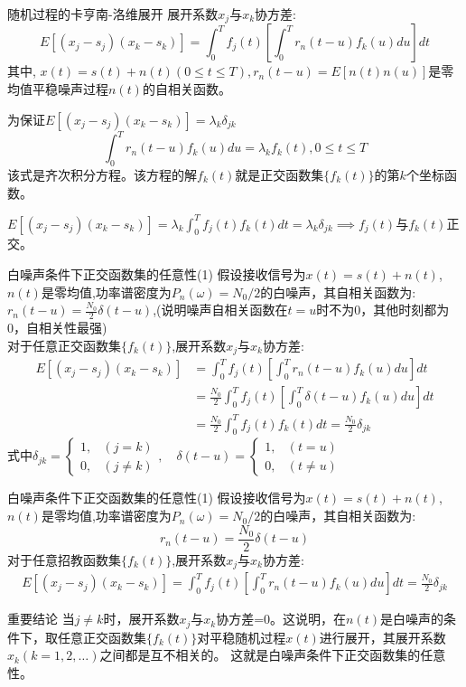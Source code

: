 \begin{frame}{随机过程的卡亨南-洛维展开}
展开系数$x_j$与$x_k$协方差:
\[E[(x_j-s_j)(x_k-s_k)]=\int_{0}^{T}f_j(t)\left[\int_{0}^{T}r_n(t-u)f_k(u)du\right]dt \]
其中, $x(t)=s(t)+n(t)(0\le t\le T),r_n(t-u)=E[n(t)n(u)]$是零均值平稳噪声过程$n(t)$的自相关函数。

为保证$E[(x_j-s_j)(x_k-s_k)]=\lambda_k\delta_{jk}$
\[\int_{0}^{T}r_n(t-u)f_k(u)du=\lambda_kf_k(t), 0\le t\le T \]
该式是齐次积分方程。该方程的解$f_k(t)$就是正交函数集$\{f_k(t) \}$的第$k$个坐标函数。

$E[(x_j-s_j)(x_k-s_k)]=\lambda_k\int_{0}^{T}f_j(t)f_k(t)dt=\lambda_k\delta_{jk}\implies f_j(t)$与$f_k(t)$正交。
\end{frame}

\begin{frame}{白噪声条件下正交函数集的任意性(1)}
假设接收信号为$x(t)=s(t)+n(t)$, $n(t)$是零均值,功率谱密度为$P_n(\omega)=N_0/2$的白噪声，其自相关函数为: $r_n(t-u)=\frac{N_0}{2}\delta(t-u)$,(说明噪声自相关函数在$t=u$时不为0，其他时刻都为0，自相关性最强)\\
对于任意正交函数集$\{f_k(t)\}$,展开系数$x_j$与$x_k$协方差:
\begin{align*}
E[(x_j-s_j)(x_k-s_k)]&=\int_{0}^{T}f_j(t)\left[\int_{0}^{T}r_n(t-u)f_k(u)du\right]dt\\
&=\frac{N_0}{2}\int_{0}^{T}f_j(t)\left[\int_{0}^{T}\delta(t-u)f_k(u)du\right]dt\\
&=\frac{N_0}{2}\int_{0}^{T}f_j(t)f_k(t)dt=\frac{N_0}{2}\delta_{jk}
\end{align*}
式中$\delta_{jk}=
\begin{cases}
1, & (j=k)\\
0, & (j\ne k) 
\end{cases},\quad
\delta(t-u)=
\begin{cases}
	1, & (t=u)\\
	0, & (t\ne u) 
\end{cases}
$
\end{frame}

\begin{frame}{白噪声条件下正交函数集的任意性(1)}
假设接收信号为$x(t)=s(t)+n(t)$, $n(t)$是零均值,功率谱密度为$P_n(\omega)=N_0/2$的白噪声，其自相关函数为: 
\[r_n(t-u)=\frac{N_0}{2}\delta(t-u)\]
对于任意招教函数集$\{f_k(t)\}$,展开系数$x_j$与$x_k$协方差:
\begin{align*}
E[(x_j-s_j)(x_k-s_k)]=\int_{0}^{T}f_j(t)\left[\int_{0}^{T}r_n(t-u)f_k(u)du\right]dt=\frac{N_0}{2}\delta_{jk}
\end{align*}
\begin{block}{重要结论}
	当$j\ne k$时，展开系数$x_j$与$x_k$协方差=0。这说明，在$n(t)$是白噪声的条件下，取任意正交函数集$\{f_k(t)\}$对平稳随机过程$x(t)$进行展开，其展开系数$x_k(k=1,2,\dots)$之间都是互不相关的。
	这就是白噪声条件下正交函数集的任意性。
\end{block}
\end{frame}

